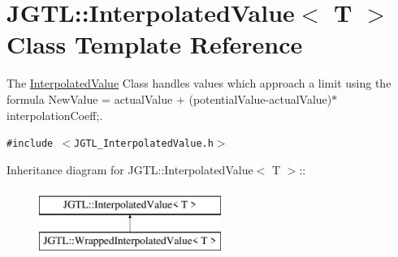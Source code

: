 \hypertarget{class_j_g_t_l_1_1_interpolated_value}{
\section{JGTL::Interpolated\-Value$<$ T $>$ Class Template Reference}
\label{class_j_g_t_l_1_1_interpolated_value}
}
The \hyperlink{class_j_g_t_l_1_1_interpolated_value}{Interpolated\-Value} Class handles values which approach a limit using the formula New\-Value = actual\-Value + (potential\-Value-actual\-Value)$\ast$interpolation\-Coeff;.  


{\tt \#include $<$JGTL\_\-Interpolated\-Value.h$>$}

Inheritance diagram for JGTL::Interpolated\-Value$<$ T $>$::\begin{figure}[H]
\begin{center}
\leavevmode
\includegraphics[height=2cm]{class_j_g_t_l_1_1_interpolated_value}
\end{center}
\end{figure}
